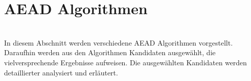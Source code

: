 \chapter{AEAD Algorithmen}
\label{sec:AEAD Algorithmen}



\\
In diesem Abschnitt werden verschiedene AEAD Algorithmen vorgestellt. Daraufhin werden aus den Algorithmen Kandidaten ausgewählt, die vielversprechende Ergebnisse aufweisen. Die ausgewählten Kandidaten werden detaillierter analysiert und erläutert.
